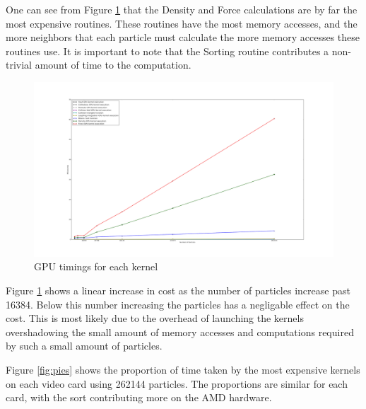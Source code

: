 One can see from Figure \ref{fig:kernel_time} that the Density and Force calculations are by far
the most expensive routines. These routines have the most memory accesses, and
the more neighbors that each particle must calculate the more memory accesses
these routines use. It is important to note that the Sorting routine
contributes a non-trivial amount of time to the computation.


\begin{figure}[!htc]
 		\centering
		\includegraphics[scale=0.35]{figures/nv_kernel_num.png}
        \caption{ GPU timings for each kernel }
        \label{fig:kernel_time}
\end{figure}

Figure \ref{fig:kernel_time} shows a linear increase in cost as the number of
particles increase past 16384. Below this number increasing the particles has a
negligable effect on the cost. This is most likely due to the overhead of
launching the kernels overshadowing the small amount of memory accesses and
computations required by such a small amount of particles. 

\pagebreak

Figure \ref{fig:pies} shows the proportion of time taken by the most expensive
kernels on each video card using 262144 particles. The proportions are similar
for each card, with the sort contributing more on the AMD hardware.

